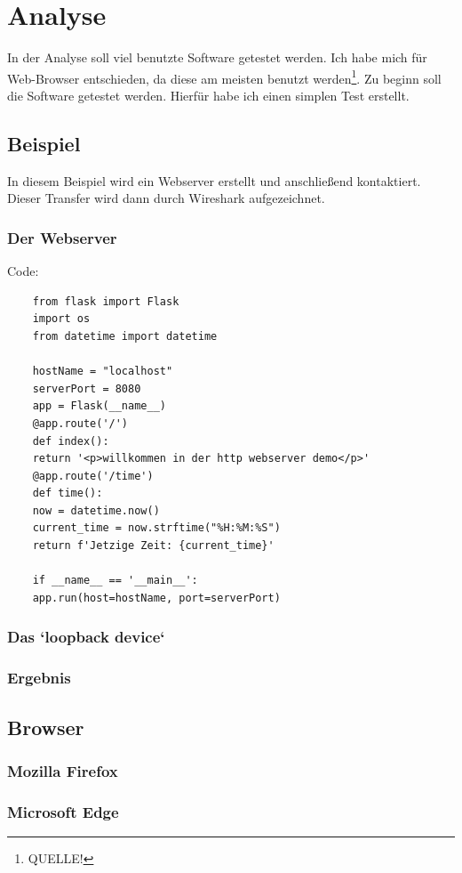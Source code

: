 \documentclass[12pt]{article}
\begin{document}
\section{Analyse}
In der Analyse soll viel benutzte Software getestet werden. Ich habe mich für Web-Browser entschieden, da diese am meisten benutzt werden\footnote{QUELLE!}. Zu beginn soll die Software getestet werden. Hierfür habe ich einen simplen Test erstellt.
\subsection{Beispiel}
In diesem Beispiel wird ein Webserver erstellt und anschließend kontaktiert. Dieser Transfer wird dann durch Wireshark aufgezeichnet.
\subsubsection{Der Webserver}
Code: 

\begin{lstlisting}
	from flask import Flask
	import os
	from datetime import datetime
	
	hostName = "localhost"
	serverPort = 8080
	app = Flask(__name__)
	@app.route('/')
	def index():
	return '<p>willkommen in der http webserver demo</p>'
	@app.route('/time')
	def time():
	now = datetime.now()
	current_time = now.strftime("%H:%M:%S")
	return f'Jetzige Zeit: {current_time}'
	
	if __name__ == '__main__':
	app.run(host=hostName, port=serverPort)
\end{lstlisting}


\subsubsection{Das `loopback device`}
\subsubsection{Ergebnis}

\subsection{Browser}
\subsubsection{Mozilla Firefox}
\subsubsection{Microsoft Edge}
\end{document}
